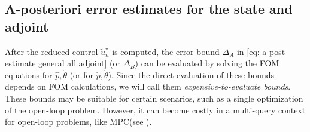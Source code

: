 \documentclass[reqno]{amsart}
\newcommand{\state}{\theta}
\newcommand{\adState}{p}
\newcommand{\inpVar}{u}
\newcommand{\reduce}[1]{\tilde{#1}}
\newcommand{\BoundControlA}{\Delta_{A}}
\newcommand{\BoundControlB}{\Delta_{B}}
\newcommand{\optInpVarRed}[1]{\reduce{\inpVar}_{#1}^\star}
\newcommand{\optInpVarRedN}{\optInpVarRed{n}}
\newcommand{\intermediateState}{\check{\state}}
\newcommand{\intermediateAdStateA}{{\hat \adState}}
\newcommand{\intermediateAdStateB}{\check{\adState}}
\newcommand{\abbr}[1]{\textsf{#1}\xspace}
\newcommand{\FOM}{\abbr{FOM}}
\newcommand{\MPC}{\abbr{MPC}}
\begin{document}
\subsection{A-posteriori error estimates for the state and adjoint}
\label{subsec:apostStateAdjoint}
%
After the reduced control $\optInpVarRedN$ is computed, the error bound $\BoundControlA$ in  \eqref{eq: a post estimate general all adjoint} (or $\BoundControlB$) can be evaluated by solving the \FOM equations for $\intermediateAdStateA, \intermediateState$ (or for $\intermediateAdStateB, \intermediateState$). Since the direct evaluation of these bounds depends on \FOM calculations, we will call them \emph{expensive-to-evaluate bounds}. These bounds may be suitable for certain scenarios, such as a single optimization of the open-loop problem. However, it can become costly in a multi-query context for open-loop problems, like \MPC (see ).
\end{document}
